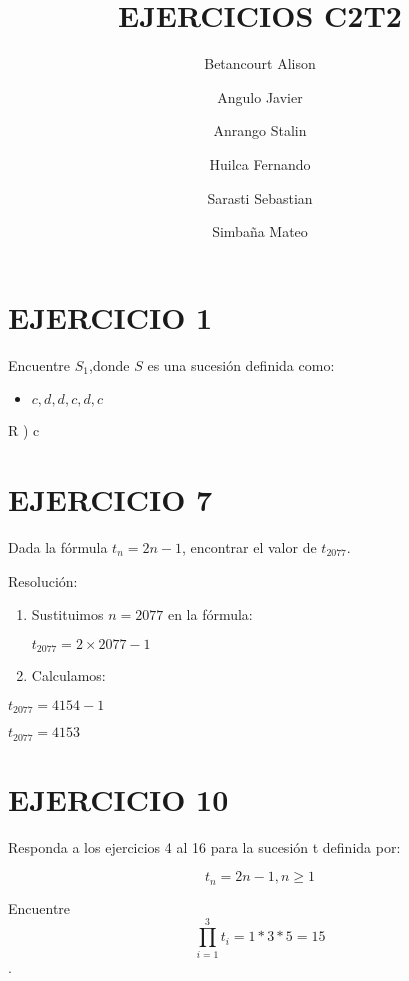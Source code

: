 \documentclass[
  letterpaper,
  DIV=11,
  numbers=noendperiod]{scrartcl}
\title{EJERCICIOS C2T2}
\author{Betancourt Alison \and Angulo Javier \and Anrango
Stalin \and Huilca Fernando \and Sarasti Sebastian \and Simbaña Mateo}
\date{}
\providecommand{\tightlist}{%
  \setlength{\itemsep}{0pt}\setlength{\parskip}{0pt}}\usepackage{longtable,booktabs,array}
\renewcommand*\contentsname{Table of contents}
\newcommand\contentsname{Table of contents}
\begin{document}
\maketitle
\renewcommand*\contentsname{Contenido}
{
\hypersetup{linkcolor=}
\setcounter{tocdepth}{3}
\tableofcontents
}
\hypertarget{ejercicio-1}{%
\section{EJERCICIO 1}\label{ejercicio-1}}

Encuentre \(S_{1}\),donde \(S\) es una sucesión definida como:

\begin{itemize}
\tightlist
\item
  \(c, d, d, c, d, c\)
\end{itemize}

R ) c

\hypertarget{ejercicio-7}{%
\section{EJERCICIO 7}\label{ejercicio-7}}

Dada la fórmula \(t_n = 2n - 1\), encontrar el valor de \(t_{2077}\).

Resolución:

\begin{enumerate}
\def\labelenumi{\arabic{enumi}.}
\tightlist
\item
  Sustituimos \(n = 2077\) en la fórmula:

  \begin{center}
    $ t_{2077} = 2 \times 2077 - 1$
    \end{center}
\item
  Calculamos:
\end{enumerate}

\begin{center}
  $t_{2077} = 4154 - 1$
  
  $t_{2077} = 4153$
  \end{center}

\hypertarget{ejercicio-10}{%
\section{EJERCICIO 10}\label{ejercicio-10}}

Responda a los ejercicios 4 al 16 para la sucesión t definida por:

\[t_n= 2n − 1, n ≥ 1\]

Encuentre \[ \prod_{i=1}^{3} t_i = 1*3*5 = 15\].
\end{document}
